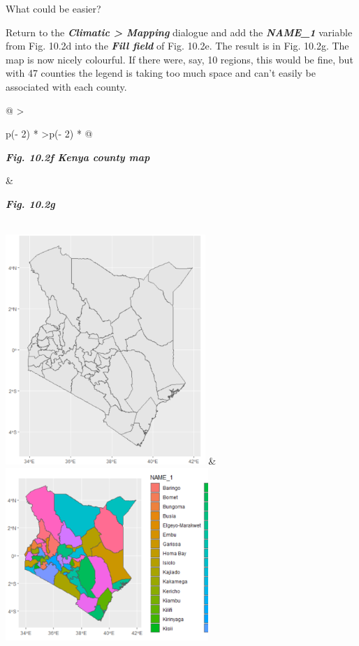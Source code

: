 \documentclass[
  letterpaper,
  DIV=11,
  numbers=noendperiod]{scrreprt}
\begin{document}
What could be easier?

Return to the \textbf{\emph{Climatic \textgreater{} Mapping}} dialogue
and add the \textbf{\emph{NAME\_1}} variable from Fig. 10.2d into the
\textbf{\emph{Fill field}} of Fig. 10.2e. The result is in Fig. 10.2g.
The map is now nicely colourful. If there were, say, 10 regions, this
would be fine, but with 47 counties the legend is taking too much space
and can't easily be associated with each county.

\begin{longtable}[]{@{}
  >{\raggedright\arraybackslash}p{(\columnwidth - 2\tabcolsep) * }
  >{\centering\arraybackslash}p{(\columnwidth - 2\tabcolsep) * }@{}}
\toprule\noalign{}
\begin{minipage}[b]{\linewidth}\raggedright
\textbf{\emph{Fig. 10.2f Kenya county map}}
\end{minipage} & \begin{minipage}[b]{\linewidth}\centering
\textbf{\emph{Fig. 10.2g}}
\end{minipage} \\
\midrule\noalign{}
\endhead
\bottomrule\noalign{}
\endlastfoot
\includegraphics[width=2.97536in,height=3.43785in]{figures/Fig10.2f.png}
&
\includegraphics[width=3.0214in,height=2.57589in]{figures/Fig10.2g.png} \\
\end{longtable}
\end{document}
